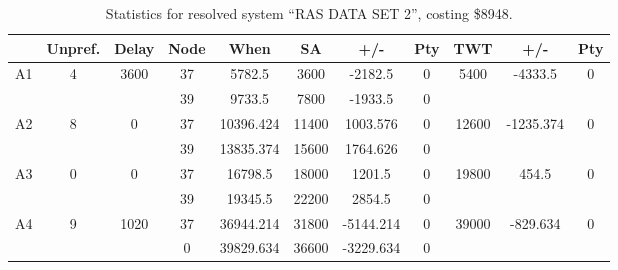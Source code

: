 \begin{sidewaystable}
\footnotesize
\caption{Statistics for resolved system ``RAS DATA SET 2'', costing \$8948.}
\centering
\begin{tabular}{c||c|c||c|c|c|c|c||c|c|c}
  \hline \hline
  &
  Unpref. & 
  Delay &
  Node &
  When &
  SA &
  +/- &
  Pty &
  TWT &
  +/- &
  Pty \\
      \hline
      \multirow{2}{*}{A1} &
      \multirow{2}{*}{4} &
      \multirow{2}{*}{3600} &
      37 &
      5782.5 &
      3600 &
        -2182.5 &
        0 &
      \multirow{2}{*}{5400} &
        \multirow{2}{*}{-4333.5} &
        \multirow{2}{*}{0}
      \\
      \cline{4-8}
       &
       &
       &
      39 &
      9733.5 &
      7800 &
        -1933.5 &
        0 &
      
         &
        
      \\
      \hline
      \multirow{2}{*}{A2} &
      \multirow{2}{*}{8} &
      \multirow{2}{*}{0} &
      37 &
      10396.424 &
      11400 &
        1003.576 &
        0 &
      \multirow{2}{*}{12600} &
        \multirow{2}{*}{-1235.374} &
        \multirow{2}{*}{0}
      \\
      \cline{4-8}
       &
       &
       &
      39 &
      13835.374 &
      15600 &
        1764.626 &
        0 &
      
         &
        
      \\
      \hline
      \multirow{2}{*}{A3} &
      \multirow{2}{*}{0} &
      \multirow{2}{*}{0} &
      37 &
      16798.5 &
      18000 &
        1201.5 &
        0 &
      \multirow{2}{*}{19800} &
        \multirow{2}{*}{454.5} &
        \multirow{2}{*}{0}
      \\
      \cline{4-8}
       &
       &
       &
      39 &
      19345.5 &
      22200 &
        2854.5 &
        0 &
      
         &
        
      \\
      \hline
      \multirow{2}{*}{A4} &
      \multirow{2}{*}{9} &
      \multirow{2}{*}{1020} &
      37 &
      36944.214 &
      31800 &
        -5144.214 &
        0 &
      \multirow{2}{*}{39000} &
        \multirow{2}{*}{-829.634} &
        \multirow{2}{*}{0}
      \\
      \cline{4-8}
       &
       &
       &
      0 &
      39829.634 &
      36600 &
        -3229.634 &
        0 &
      

\end{tabular}
\end{sidewaystable}
